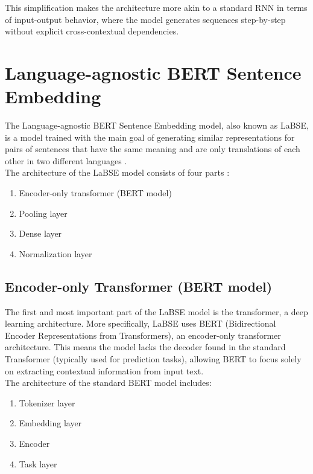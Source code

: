 This simplification makes the architecture more akin to a standard RNN in terms of input-output behavior, where the model generates sequences step-by-step without explicit cross-contextual dependencies.

\section{Language-agnostic BERT Sentence Embedding}
\label{theoryLaBSE}

The Language-agnostic BERT Sentence Embedding model, also known as LaBSE, is a model trained with the main goal of generating similar representations for pairs of sentences that have the same meaning and are only translations of each other in two different languages \cite{labse_kaggle}.
\\

The architecture of the LaBSE model consists of four parts \cite{labse_hug}:

\begin{enumerate}
	\item Encoder-only transformer (BERT model)
	\item Pooling layer
	\item Dense layer
	\item Normalization layer
\end{enumerate}

\subsection{Encoder-only Transformer (BERT model)}
\label{emb:trans}

The first and most important part of the LaBSE model is the transformer, a deep learning architecture. More specifically, LaBSE uses BERT (Bidirectional Encoder Representations from Transformers), an encoder-only transformer architecture. This means the model lacks the decoder found in the standard Transformer (typically used for prediction tasks), allowing BERT to focus solely on extracting contextual information from input text.
\\

The architecture of the standard BERT model includes:

\begin{enumerate}
	\item Tokenizer layer
	\item Embedding layer
	\item Encoder
	\item Task layer
\end{enumerate}

